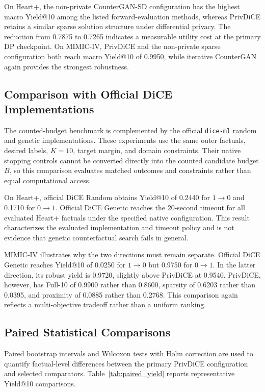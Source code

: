 \documentclass[preprint,12pt]{elsarticle}
\begin{document}
On Heart+, the non-private CounterGAN-SD configuration has the highest macro
Yield@10 among the listed forward-evaluation methods, whereas PrivDiCE retains
a similar sparse solution structure under differential privacy. The reduction
from 0.7875 to 0.7265 indicates a measurable utility cost at the primary DP
checkpoint. On MIMIC-IV, PrivDiCE and the non-private sparse configuration both
reach macro Yield@10 of 0.9950, while iterative CounterGAN again provides the
strongest robustness.

\subsection{Comparison with Official DiCE Implementations}
\label{subsec:official_dice_results}

The counted-budget benchmark is complemented by the official
\texttt{dice-ml} random and genetic implementations. These experiments use the
same outer factuals, desired labels, $K=10$, target margin, and domain
constraints. Their native stopping controls cannot be converted directly into
the counted candidate budget $B$, so this comparison evaluates matched
outcomes and constraints rather than equal computational access.

On Heart+, official DiCE Random obtains Yield@10 of 0.2440 for
$1\rightarrow0$ and 0.1710 for $0\rightarrow1$. Official DiCE Genetic reaches
the 20-second timeout for all evaluated Heart+ factuals under the specified
native configuration. This result characterizes the evaluated implementation
and timeout policy and is not evidence that genetic counterfactual search fails
in general.

MIMIC-IV illustrates why the two directions must remain separate. Official
DiCE Genetic reaches Yield@10 of 0.0250 for $1\rightarrow0$ but 0.9750 for
$0\rightarrow1$. In the latter direction, its robust yield is 0.9720, slightly
above PrivDiCE at 0.9540. PrivDiCE, however, has Full-10 of 0.9900 rather than
0.8600, sparsity of 0.6203 rather than 0.0395, and proximity of 0.0885 rather
than 0.2768. This comparison again reflects a multi-objective tradeoff rather
than a uniform ranking.

\subsection{Paired Statistical Comparisons}
\label{subsec:statistical_results}

Paired bootstrap intervals and Wilcoxon tests with Holm correction are used to
quantify factual-level differences between the primary PrivDiCE configuration
and selected comparators. Table~\ref{tab:paired_yield} reports representative
Yield@10 comparisons.
\end{document}
